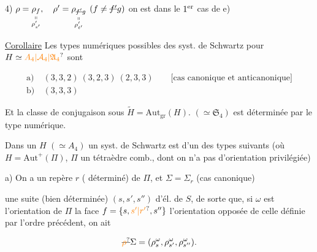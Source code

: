 
4) $\rho=\underset{\substack{\shortparallel\\\rho'_{s'}}}{\rho_f},\quad\rho'=\underset{\substack{\shortparallel\\\rho'_{t'}}}{\rho_{\deleted{f'}g}}$  $(f\ne\deleted{f'}g)$ on est dans le $1\textsuperscript{er}$ cas de e)


\uline{Corollaire} Les types numériques possibles des syst. de Schwartz pour $H\simeq\unsure{A_4|\mathcal A_4|\mathfrak A_4}$ sont

\[
\begin{aligned}
\text{a)}\ &(3,3,2)\ (3,2,3)\ (2,3,3)\qquad\text{[cas canonique et anticanonique]}\\
\text{b)}\ &(3,3,3)
\end{aligned}
\]

Et la classe de conjugaison sous $\widetilde H=\mathrm{Aut}_{\mathrm{gr}}(H)$. $(\simeq\mathfrak S_4)$ est déterminée par le type numérique.

Dans un $H$ $(\simeq A_4)$ un syst. de Schwartz est d'un des types suivants (où $H=\mathrm{Aut}^{+}(\Pi)$, $\Pi$ un tétraèdre comb., dont on n'a pas d'orientation privilégiée)


a) On a un repère $r$ ( déterminé) de $\Pi$, et $\Sigma=\Sigma_r$ (cas canonique)





une suite (bien déterminée) $(s,s',s'')$ d'él.  de $S$, de sorte que, si $\omega$ est l'orientation de $\Pi$   la face $f=\{s,\unsure{s'|r'},s''\}$ l'orientation opposée de celle définie par l'ordre précédent, on ait

\[
\deleted{\unsure{\rho}}\Sigma=(\rho_s^\omega,\rho_{s'}^\omega,\rho_{s''}^\omega).
\]

